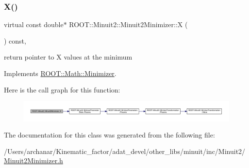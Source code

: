 \subsubsection{\texorpdfstring{X()}{X()}\hspace{0.1cm}{\footnotesize\ttfamily [2/2]}}
{\footnotesize\ttfamily virtual const double$\ast$ R\+O\+O\+T\+::\+Minuit2\+::\+Minuit2\+Minimizer\+::X (\begin{DoxyParamCaption}{ }\end{DoxyParamCaption}) const\hspace{0.3cm}{\ttfamily [inline]}, {\ttfamily [virtual]}}



return pointer to X values at the minimum 



Implements \mbox{\hyperlink{classROOT_1_1Math_1_1Minimizer_a35c7c2caf54e548f892d84795209edad}{R\+O\+O\+T\+::\+Math\+::\+Minimizer}}.

Here is the call graph for this function\+:
\nopagebreak
\begin{figure}[H]
\begin{center}
\leavevmode
\includegraphics[width=350pt]{d0/d9c/classROOT_1_1Minuit2_1_1Minuit2Minimizer_ac9372eb08937cf14acb8862ba3166c26_cgraph}
\end{center}
\end{figure}


The documentation for this class was generated from the following file\+:\begin{DoxyCompactItemize}
\item 
/\+Users/archanar/\+Kinematic\+\_\+factor/adat\+\_\+devel/other\+\_\+libs/minuit/inc/\+Minuit2/\mbox{\hyperlink{other__libs_2minuit_2inc_2Minuit2_2Minuit2Minimizer_8h}{Minuit2\+Minimizer.\+h}}\end{DoxyCompactItemize}
